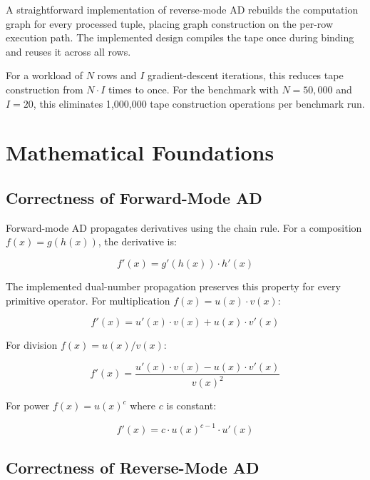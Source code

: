 \documentclass[12pt]{report}
\begin{document}
A straightforward implementation of reverse-mode AD rebuilds the
computation graph for every processed tuple, placing graph construction
on the per-row execution path. The implemented design compiles the tape
once during binding and reuses it across all rows.

For a workload of $N$ rows and $I$ gradient-descent iterations, this
reduces tape construction from $N \cdot I$ times to once. For the
benchmark with $N=50{,}000$ and $I=20$, this eliminates 1{,}000{,}000
tape construction operations per benchmark run.


\chapter{Mathematical Foundations}
\label{app:proofs}

\section{Correctness of Forward-Mode AD}

Forward-mode AD propagates derivatives using the chain rule. For a
composition $f(x) = g(h(x))$, the derivative is:

\begin{equation}
f'(x) = g'(h(x)) \cdot h'(x)
\end{equation}

The implemented dual-number propagation preserves this property for
every primitive operator. For multiplication $f(x) = u(x) \cdot v(x)$:

\begin{equation}
f'(x) = u'(x) \cdot v(x) + u(x) \cdot v'(x)
\end{equation}

For division $f(x) = u(x) / v(x)$:

\begin{equation}
f'(x) = \frac{u'(x) \cdot v(x) - u(x) \cdot v'(x)}{v(x)^2}
\end{equation}

For power $f(x) = u(x)^c$ where $c$ is constant:

\begin{equation}
f'(x) = c \cdot u(x)^{c-1} \cdot u'(x)
\end{equation}

\section{Correctness of Reverse-Mode AD}
\end{document}

